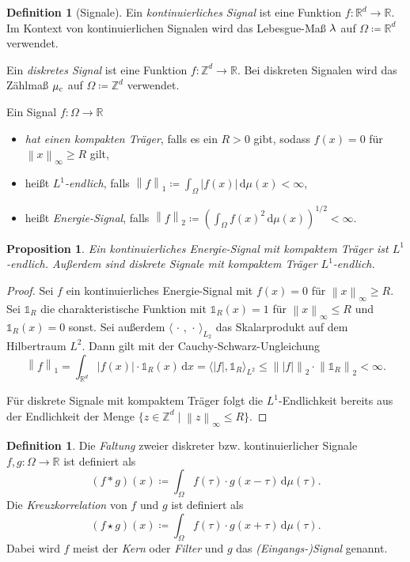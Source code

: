 \documentclass[paper=a4, 	%
		fontsize=11pt, 		%
		abstracton, 	%
		headsepline, 	%
		notitlepage	%
		]{scrartcl}
\newtheorem{proposition}[theorem]{Proposition}
\theoremstyle{definition}
\newtheorem{definition}[theorem]{Definition}
\newcommand{\R}{\mathbb{R}}
\newcommand{\Z}{\mathbb{Z}}
\newcommand{\diff}{\,\textrm{d}}
\newcommand{\norm}[1]{\left\lVert#1\right\rVert}
\newcommand{\abs}[1]{\left\lvert#1\right\rvert}
\begin{document}
\begin{definition}[Signale]
    Ein \emph{kontinuierliches Signal} ist eine Funktion $f: \R^d\rightarrow \R$.
    Im Kontext von kontinuierlichen Signalen wird das Lebesgue-Maß $\lambda$ auf $\Omega\coloneqq \R^d$ verwendet.

    Ein \emph{diskretes Signal} ist eine Funktion $f: \Z^d \rightarrow \R$.
    Bei diskreten Signalen wird das Zählmaß $\mu_c$ auf $\Omega\coloneqq \Z^d$ verwendet.

    Ein Signal $f: \Omega \rightarrow \R$
    \begin{itemize}
        \item \emph{hat einen kompakten Träger}, falls es ein $R > 0$ gibt, sodass $f(x) = 0$ für $\norm{x}_\infty \geq R$ gilt,
        \item heißt \emph{$L^1$-endlich}, falls $\norm{f}_1 \coloneqq \int_{\Omega} \abs{f(x)} \diff \mu(x) < \infty$,
        \item heißt \emph{Energie-Signal}, falls $\norm{f}_2 \coloneqq \left(\int_{\Omega} f(x)^2 \diff \mu(x) \right)^{1/2} < \infty$.
    \end{itemize}
\end{definition}

\begin{proposition}
    Ein kontinuierliches Energie-Signal mit kompaktem Träger ist $L^1$-endlich.
    Außerdem sind diskrete Signale mit kompaktem Träger $L^1$-endlich.
\end{proposition}
\begin{proof}
    Sei $f$ ein kontinuierliches Energie-Signal mit $f(x) = 0$ für $\norm{x}_{\infty} \geq R$.
    Sei $\mathbb{1}_R$ die charakteristische Funktion mit $\mathbb{1}_R(x) = 1$ für $\norm{x}_\infty \leq R$ und $\mathbb{1}_R(x) = 0$ sonst.
    Sei außerdem $\langle \,\cdot\, , \,\cdot\, \rangle_{L_2}$ das Skalarprodukt auf dem Hilbertraum $L^2$.
    Dann gilt mit der Cauchy-Schwarz-Ungleichung
    \[
        \norm{f}_1 
        = \int_{\R^d} \abs{f(x)} \cdot \mathbb{1}_R(x) \diff x
        = \langle \abs{f}, \mathbb{1}_R \rangle_{L^2}
        \leq \norm{\abs{f}}_2 \cdot \norm{\mathbb{1}_R}_2 < \infty .
    \]

    Für diskrete Signale mit kompaktem Träger folgt die $L^1$-Endlichkeit bereits aus der Endlichkeit der Menge $\{ z\in\Z^d \mid \norm{z}_{\infty} \leq R\}$.
\end{proof}

\begin{definition}
    Die \emph{Faltung} zweier diskreter bzw. kontinuierlicher Signale $f,g: \Omega\rightarrow \R$ ist definiert als 
    \[
        (f * g)(x) \coloneqq \int_\Omega f(\tau) \cdot g(x-\tau) \diff \mu(\tau).
    \]
    Die \emph{Kreuzkorrelation} von $f$ und $g$ ist definiert als
    \[
        (f \star g)(x) \coloneqq \int_\Omega f(\tau) \cdot g(x+\tau) \diff \mu(\tau).
    \]
    Dabei wird $f$ meist der \emph{Kern} oder \emph{Filter} und $g$ das \emph{(Eingangs-)Signal} genannt.
\end{definition}
\end{document}
